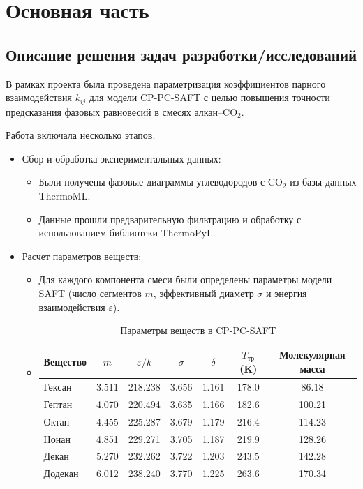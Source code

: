 \documentclass[a4paper,12pt]{article}
\begin{document}
\section{Основная часть}

\subsection{Описание решения задач разработки/исследований}

В рамках проекта была проведена параметризация коэффициентов парного взаимодействия \( k_{ij} \) для модели CP-PC-SAFT с целью повышения точности предсказания фазовых равновесий в смесях алкан–$\mathrm{CO}_{2}$.

Работа включала несколько этапов:
\begin{itemize}
    \item Сбор и обработка экспериментальных данных:
    \begin{itemize}
        \item Были получены фазовые диаграммы углеводородов с $\mathrm{CO}_{2}$ из базы данных ThermoML.
        \item Данные прошли предварительную фильтрацию и обработку с использованием библиотеки ThermoPyL.
    \end{itemize}
    \item Расчет параметров веществ:
    \begin{itemize}
        \item Для каждого компонента смеси были определены параметры модели SAFT (число сегментов \( m \), эффективный диаметр \( \sigma \) и энергия взаимодействия \( \varepsilon \)).
	\item
		\begin{table}[ht]
		    \centering
		    \caption{Параметры веществ в CP-PC-SAFT}
		    \begin{tabular}{|l|c|c|c|c|c|c|}
		        \hline
		        \textbf{Вещество} & \textbf{$m$} & \textbf{$\varepsilon/k$} & \textbf{$\sigma$} & \textbf{$\delta$} & \textbf{$T_{\text{тр}}$ (K)} & \textbf{Молекулярная масса} \\
		        \hline
		        Гексан  & 3.511  & 218.238 & 3.656 & 1.161 & 178.0  & 86.18 \\
		        Гептан  & 4.070  & 220.494 & 3.635 & 1.166 & 182.6  & 100.21 \\
		        Октан   & 4.455  & 225.287 & 3.679 & 1.179 & 216.4  & 114.23 \\
		        Нонан   & 4.851  & 229.271 & 3.705 & 1.187 & 219.9  & 128.26 \\
		        Декан   & 5.270  & 232.262 & 3.722 & 1.203 & 243.5  & 142.28 \\
		        Додекан & 6.012  & 238.240 & 3.770 & 1.225 & 263.6  & 170.34 \\
		        \hline
		    \end{tabular}
		\end{table}


\end{itemize}
\end{itemize}
\end{document}
